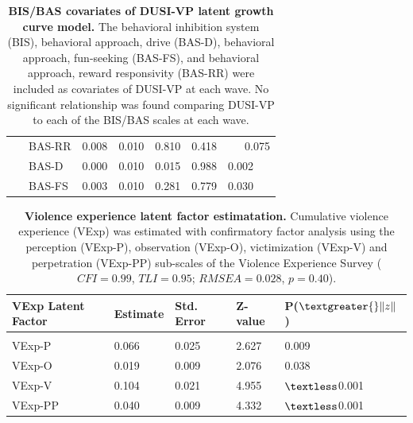 \documentclass[utf8]{article}
\begin{document}
\begin{table}[h!]
\begin{tabular}{llllll}
\ \ \ BAS-RR                         & 0.008    & 0.010      & 0.810   & 0.418                    & \ \ \ 0.075   \\
\ \ \ BAS-D                          & 0.000    & 0.010      & 0.015   & 0.988                    & 0.002   \\
\ \ \ BAS-FS                         & 0.003    & 0.010      & 0.281   & 0.779                    & 0.030   \\  
\end{tabular}
\caption{\textbf{BIS/BAS covariates of DUSI-VP latent growth curve model.} The behavioral inhibition system (BIS), behavioral approach, drive (BAS-D), behavioral approach, fun-seeking (BAS-FS), and behavioral approach, reward responsivity (BAS-RR) were included as covariates of DUSI-VP at each wave. No significant relationship was found comparing DUSI-VP to each of the BIS/BAS scales at each wave. \label{tab:2}}
\end{table}
\begin{table}[h!]
\begin{tabular}{lllll}
VExp Latent Factor & Estimate & Std. Error & Z-value & P($\textgreater{}\|z\|$) \\ \hline
                   &          &            &         &                          \\
VExp-P             & 0.066    & 0.025      & 2.627   & 0.009                    \\
VExp-O             & 0.019    & 0.009      & 2.076   & 0.038                    \\
VExp-V             & 0.104    & 0.021      & 4.955   & $\textless$0.001                    \\
VExp-PP            & 0.040    & 0.009      & 4.332   & $\textless$0.001                               
\end{tabular}
\caption{\textbf{Violence experience latent factor estimatation.} Cumulative violence experience (VExp) was estimated with confirmatory factor analysis using the perception (VExp-P), observation (VExp-O), victimization (VExp-V) and perpetration (VExp-PP) sub-scales of the Violence Experience Survey ($CFI = 0.99$, $TLI = 0.95$; $RMSEA = 0.028$, $p = 0.40$).  \label{tab:3}}
\end{table} 
\end{document}
